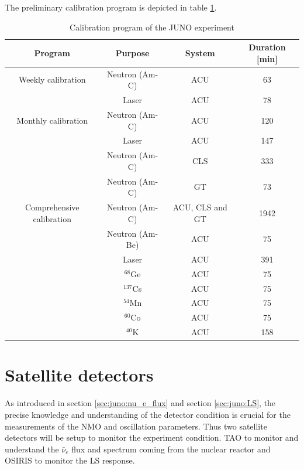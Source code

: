 \documentclass[../main.tex]{subfiles}
\begin{document}
The preliminary calibration program is depicted in table \ref{tab:juno:calib_prog}.

\begin{table}[ht]
  \centering
  \begin{tabular}{c c c c}
    \hline
    Program & Purpose & System & Duration [min] \\
    \hline
    Weekly calibration & Neutron (Am-C) & ACU & 63 \\
                       & Laser & ACU & 78  \\
                       \hline
    Monthly calibration & Neutron (Am-C) & ACU & 120 \\
                        & Laser  & ACU  & 147 \\
                        & Neutron (Am-C) & CLS & 333 \\
                        & Neutron (Am-C) & GT  & 73  \\
                        \hline
    Comprehensive calibration & Neutron (Am-C) & ACU, CLS and GT & 1942 \\
                              & Neutron (Am-Be) & ACU & 75 \\
                              & Laser & ACU & 391 \\
                              & $^{68}$Ge & ACU & 75 \\
                              & $^{137}$Cs & ACU & 75 \\
                              & $^{54}$Mn & ACU & 75 \\
                              & $^{60}$Co & ACU & 75 \\
                              & $^{40}$K & ACU & 158 \\
    \hline
  \end{tabular}
  \caption{Calibration program of the JUNO experiment}
  \label{tab:juno:calib_prog}
\end{table}

\section{Satellite detectors}
As introduced in section \ref{sec:juno:nu_e_flux} and section \ref{sec:juno:LS}, the precise knowledge and understanding of the detector condition is crucial for the measurements of the NMO and oscillation parameters. Thus two satellite detectors will be setup to monitor the experiment condition. TAO to monitor and understand the $\bar{\nu}_e$ flux and spectrum coming from the nuclear reactor and OSIRIS to monitor the LS response.
\end{document}
